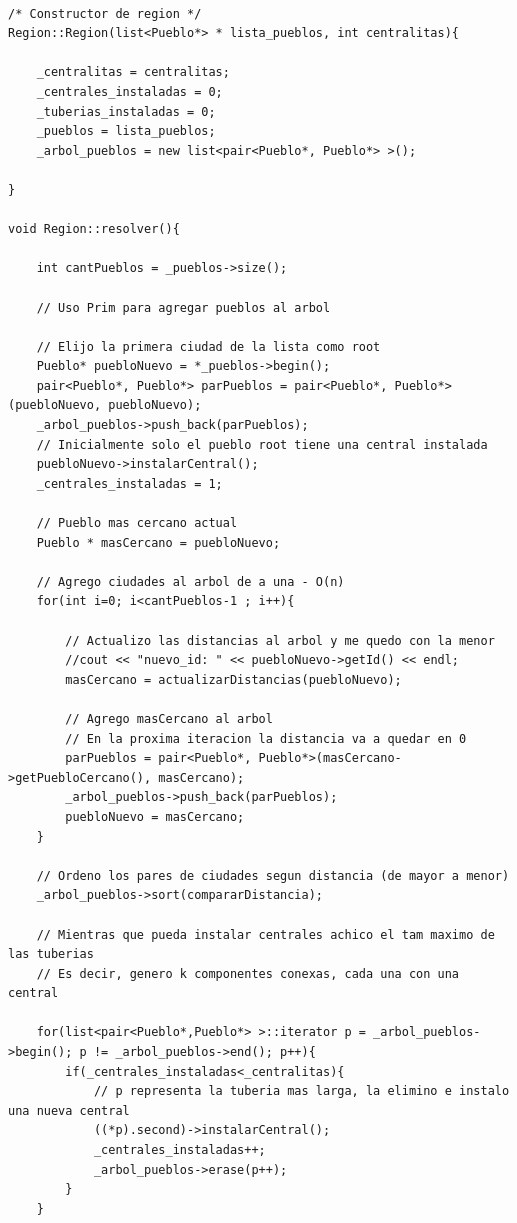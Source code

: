 \begin{lstlisting}

/* Constructor de region */
Region::Region(list<Pueblo*> * lista_pueblos, int centralitas){
	
	_centralitas = centralitas;
	_centrales_instaladas = 0;
	_tuberias_instaladas = 0;
	_pueblos = lista_pueblos;
	_arbol_pueblos = new list<pair<Pueblo*, Pueblo*> >();

}

void Region::resolver(){

	int cantPueblos = _pueblos->size();
	
	// Uso Prim para agregar pueblos al arbol

	// Elijo la primera ciudad de la lista como root
	Pueblo* puebloNuevo = *_pueblos->begin();
	pair<Pueblo*, Pueblo*> parPueblos = pair<Pueblo*, Pueblo*>(puebloNuevo, puebloNuevo);
	_arbol_pueblos->push_back(parPueblos);
	// Inicialmente solo el pueblo root tiene una central instalada
	puebloNuevo->instalarCentral();
	_centrales_instaladas = 1;

	// Pueblo mas cercano actual
	Pueblo * masCercano = puebloNuevo;

	// Agrego ciudades al arbol de a una - O(n)
	for(int i=0; i<cantPueblos-1 ; i++){
		
		// Actualizo las distancias al arbol y me quedo con la menor
		//cout << "nuevo_id: " << puebloNuevo->getId() << endl;
		masCercano = actualizarDistancias(puebloNuevo);

		// Agrego masCercano al arbol
		// En la proxima iteracion la distancia va a quedar en 0
		parPueblos = pair<Pueblo*, Pueblo*>(masCercano->getPuebloCercano(), masCercano);
		_arbol_pueblos->push_back(parPueblos);
		puebloNuevo = masCercano;
	}

	// Ordeno los pares de ciudades segun distancia (de mayor a menor)
	_arbol_pueblos->sort(compararDistancia);

	// Mientras que pueda instalar centrales achico el tam maximo de las tuberias
	// Es decir, genero k componentes conexas, cada una con una central

	for(list<pair<Pueblo*,Pueblo*> >::iterator p = _arbol_pueblos->begin(); p != _arbol_pueblos->end(); p++){
		if(_centrales_instaladas<_centralitas){
			// p representa la tuberia mas larga, la elimino e instalo una nueva central
			((*p).second)->instalarCentral();
			_centrales_instaladas++;
			_arbol_pueblos->erase(p++);
		}	
	}


\end{lstlisting}
